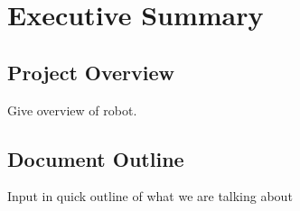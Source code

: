 
\section {Executive Summary}
\label{sec:executive_summary}

\subsection{Project Overview}
Give overview of robot. 
\subsection{Document Outline}
Input in quick outline of what we are talking about